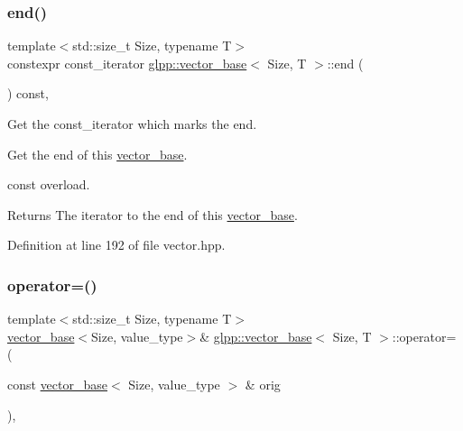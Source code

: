 \subsubsection{\texorpdfstring{end()}{end()}\hspace{0.1cm}{\footnotesize\ttfamily [2/2]}}
{\footnotesize\ttfamily template$<$std\+::size\+\_\+t Size, typename T$>$ \\
constexpr const\+\_\+iterator \hyperlink{classglpp_1_1vector__base}{glpp\+::vector\+\_\+base}$<$ Size, T $>$\+::end (\begin{DoxyParamCaption}{ }\end{DoxyParamCaption}) const\hspace{0.3cm}{\ttfamily [inline]}, {\ttfamily [noexcept]}}



Get the const\+\_\+iterator which marks the end. 

Get the end of this \hyperlink{classglpp_1_1vector__base}{vector\+\_\+base}.

{\ttfamily const} overload. 

\begin{DoxyReturn}{Returns}
The iterator to the end of this \hyperlink{classglpp_1_1vector__base}{vector\+\_\+base}. 
\end{DoxyReturn}


Definition at line 192 of file vector.\+hpp.

\mbox{\label{classglpp_1_1vector__base_a580690059c9ad00c8e4d715a904bb390}} 
\subsubsection{\texorpdfstring{operator=()}{operator=()}\hspace{0.1cm}{\footnotesize\ttfamily [1/2]}}
{\footnotesize\ttfamily template$<$std\+::size\+\_\+t Size, typename T$>$ \\
\hyperlink{classglpp_1_1vector__base}{vector\+\_\+base}$<$Size, value\+\_\+type$>$\& \hyperlink{classglpp_1_1vector__base}{glpp\+::vector\+\_\+base}$<$ Size, T $>$\+::operator= (\begin{DoxyParamCaption}\item[{const \hyperlink{classglpp_1_1vector__base}{vector\+\_\+base}$<$ Size, value\+\_\+type $>$ \&}]{orig }\end{DoxyParamCaption})\hspace{0.3cm}{\ttfamily [inline]}, {\ttfamily [noexcept]}}



